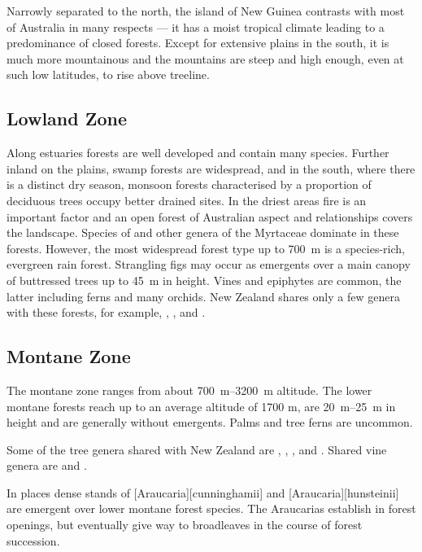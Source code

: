 Narrowly separated to the north, the island of New Guinea contrasts with most of Australia in many respects --- it has a moist tropical climate leading to a predominance of closed forests.
Except for extensive plains in the south, it is much more mountainous and the mountains are steep and high enough, even at such low latitudes, to rise above treeline.

\subsection{Lowland Zone}

Along estuaries  forests are well developed and contain many species.
Further inland on the plains, swamp forests are widespread, and in the south, where there is a distinct dry season, monsoon forests characterised by a proportion of deciduous trees occupy better drained sites.
In the driest areas fire is an important factor and an open forest of Australian aspect and relationships covers the landscape.
Species of  and other genera of the Myrtaceae dominate in these forests.
However, the most widespread forest type up to \SI{700}{\metre} is a species-rich, evergreen rain forest.
Strangling figs may occur as emergents over a main canopy of buttressed trees up to \SI{45}{\metre} in height.
Vines and epiphytes are common, the latter including ferns and many orchids.
New Zealand shares only a few genera with these forests, for example, , ,  and .

\subsection{Montane Zone}

The montane zone ranges from about \SIrange{700}{3200}{\metre} altitude.
The lower montane forests reach up to an average altitude of 1700 m, are \SIrange{20}{25}{\metre} in height and are generally without emergents.
Palms and tree ferns are uncommon.

Some of the tree genera shared with New Zealand are , , ,  and .
Shared vine genera are  and .

In places dense stands of [Araucaria][cunninghamii] and [Araucaria][hunsteinii] are emergent over lower montane forest species.
The Araucarias establish in forest openings, but eventually give way to broadleaves in the course of forest succession.

